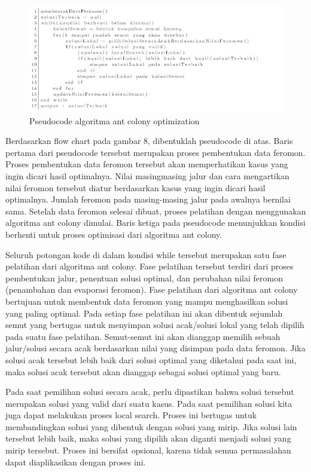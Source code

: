 \documentclass[a4paper,twoside]{article}
\begin{document}
\begin{enumerate}
\begin{itemize}
\begin{enumerate}
			\begin{figure}[H]
				\centering
				\includegraphics[scale=0.80]{gambar8}
				\caption[Pseudocode ACO] {Pseudocode algoritma ant colony optimization}
				\label{fig:pseudocodeACO}
			\end{figure}
		
			Berdasarkan flow chart pada gambar 8, dibentuklah pseudocode di atas. Baris pertama
			dari pseudocode tersebut merupakan proses pembentukan data feromon. Proses pembentukan data
			feromon tersebut akan memperhatikan kasus yang ingin dicari hasil optimalnya. Nilai masingmasing
			jalur dan cara mengartikan nilai feromon tersebut diatur berdasarkan kasus yang ingin
			dicari hasil optimalnya. Jumlah feromon pada masing-masing jalur pada awalnya bernilai sama.
			Setelah data feromon selesai dibuat, proses pelatihan dengan menggunakan algoritma ant colony
			dimulai. Baris ketiga pada pseudocode menunjukkan kondisi berhenti untuk proses optimisasi dari
			algoritma ant colony. 
			
			Seluruh potongan kode di dalam kondisi while tersebut merupakan satu fase
			pelatihan dari algoritma ant colony. Fase pelatihan tersebut terdiri dari proses pembentukan jalur,
			penentuan solusi optimal, dan perubahan nilai feromon (penambahan dan evaporasi feromon).
			Fase pelatihan dari algoritma ant colony bertujuan untuk membentuk data feromon yang mampu
			menghasilkan solusi yang paling optimal. Pada setiap fase pelatihan ini akan dibentuk sejumlah
			semut yang bertugas untuk menyimpan solusi acak/solusi lokal yang telah dipilih pada suatu fase
			pelatihan. Semut-semut ini akan dianggap memilih sebuah jalur/solusi secara acak berdasarkan
			nilai yang disimpan pada data feromon. Jika solusi acak tersebut lebih baik dari solusi optimal
			yang diketahui pada saat ini, maka solusi acak tersebut akan dianggap sebagai solusi optimal yang
			baru.
			
			Pada saat pemilihan solusi secara acak, perlu dipastikan bahwa solusi tersebut merupakan solusi
			yang valid dari suatu kasus. Pada saat pemilihan solusi kita juga dapat melakukan proses local
			search. Proses ini bertugas untuk membandingkan solusi yang dibentuk dengan solusi yang mirip.
			Jika solusi lain tersebut lebih baik, maka solusi yang dipilih akan diganti menjadi solusi yang mirip
			tersebut. Proses ini bersifat opsional, karena tidak semua permasalahan dapat diaplikasikan dengan
			proses ini.
			

\end{enumerate}
\end{itemize}
\end{enumerate}
\end{document}
